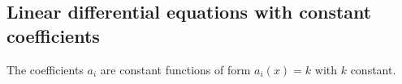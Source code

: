 \newsectionNoPB
\subsection{Linear differential equations with constant coefficients}
The coefficients $a_i$ are constant functions of form $a_i(x) = k$ with $k$ constant.
